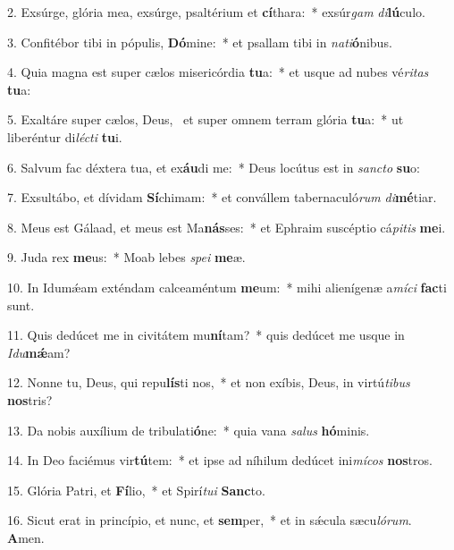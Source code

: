 2. Exsúrge, glória mea, exsúrge, psaltérium et \textbf{cí}thara:~*  exsúr\textit{gam} \textit{di}\textbf{lú}culo.\

3. Confitébor tibi in pópulis, \textbf{Dó}mine:~*  et psallam tibi in \textit{na}\textit{ti}\textbf{ó}nibus.\

4. Quia magna est super cælos misericórdia \textbf{tu}a:~*  et usque ad nubes vé\textit{ri}\textit{tas} \textbf{tu}a:\

5. Exaltáre super cælos, Deus, \dag\  et super omnem terram glória \textbf{tu}a:~*  ut liberéntur di\textit{léc}\textit{ti} \textbf{tu}i.\

6. Salvum fac déxtera tua, et ex\textbf{áu}di me:~*  Deus locútus est in \textit{sanc}\textit{to} \textbf{su}o:\

7. Exsultábo, et dívidam \textbf{Sí}chimam:~*  et convállem tabernaculó\textit{rum} \textit{di}\textbf{mé}tiar.\

8. Meus est Gálaad, et meus est Ma\textbf{nás}ses:~*  et Ephraim suscéptio cá\textit{pi}\textit{tis} \textbf{me}i.\

9. Juda rex \textbf{me}us:~*  Moab lebes \textit{spe}\textit{i} \textbf{me}æ.\

10. In Idumǽam exténdam calceaméntum \textbf{me}um:~*  mihi alienígenæ a\textit{mí}\textit{ci} \textbf{fac}ti sunt.\

11. Quis dedúcet me in civitátem mu\textbf{ní}tam?~*  quis dedúcet me usque in \textit{I}\textit{du}\textbf{mǽ}am?\

12. Nonne tu, Deus, qui repu\textbf{lís}ti nos,~*  et non exíbis, Deus, in virtú\textit{ti}\textit{bus} \textbf{nos}tris?\

13. Da nobis auxílium de tribulati\textbf{ó}ne:~*  quia vana \textit{sa}\textit{lus} \textbf{hó}minis.\

14. In Deo faciémus vir\textbf{tú}tem:~*  et ipse ad níhilum dedúcet ini\textit{mí}\textit{cos} \textbf{nos}tros.\

15. Glória Patri, et \textbf{Fí}lio,~*  et Spirí\textit{tu}\textit{i} \textbf{Sanc}to.\

16. Sicut erat in princípio, et nunc, et \textbf{sem}per,~*  et in sǽcula sæcu\textit{ló}\textit{rum}. \textbf{A}men.\

